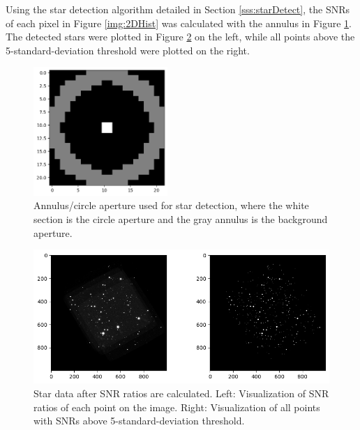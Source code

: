 \documentclass{article}
\begin{document}
\begin{multicols}{2}

Using the star detection algorithm detailed in Section \ref{sss:starDetect}, the SNRs of each pixel in Figure \ref{img:2DHist} was calculated with the annulus in Figure \ref{img:annulus}. The detected stars were plotted in Figure \ref{img:imgSNR} on the left, while all points above the 5-standard-deviation threshold were plotted on the right.

\end{multicols}

\begin{figure}[h]
    \centering
    \includegraphics[width=2in]{annulus_png.png}
    \caption{Annulus/circle aperture used for star detection, where the white section is the circle aperture and the gray annulus is the background aperture.}
    \label{img:annulus}
\end{figure}

\begin{figure}[h]
    \centering
    \includegraphics[width=\textwidth]{imgSNR.png}
    \caption{Star data after SNR ratios are calculated. Left: Visualization of SNR ratios of each point on the image. Right: Visualization of all points with SNRs above 5-standard-deviation threshold.}
    \label{img:imgSNR}
\end{figure}
\end{document}

